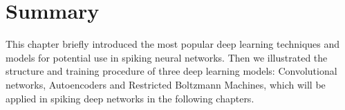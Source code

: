 
\section{Summary}
This chapter briefly introduced the most popular deep learning techniques and models for potential use in spiking neural networks.
Then we illustrated the structure and training procedure of three deep learning models: Convolutional networks, Autoencoders and Restricted Boltzmann Machines, which will be applied in spiking deep networks in the following chapters.